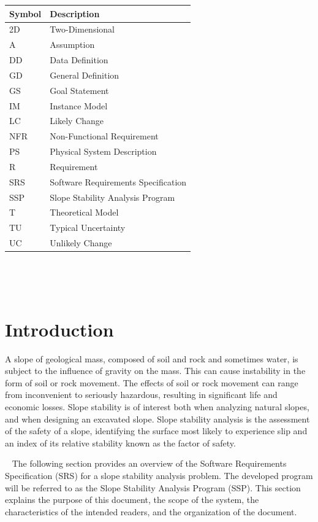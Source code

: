 \documentclass[12pt]{article}
\newcommand{\progname}{SSP}
\renewcommand{\arraystretch}{1}
\begin{document}
\renewcommand{\arraystretch}{1.2}
\begin{tabular}{l l} 
  \toprule		
  \textbf{Symbol} & \textbf{Description}\\
  \midrule 
  2D & Two-Dimensional\\
  A & Assumption\\
  DD & Data Definition\\
  GD & General Definition\\
  GS & Goal Statement\\
  IM & Instance Model\\
  LC & Likely Change\\
  NFR & Non-Functional Requirement\\
  PS & Physical System Description\\
  R & Requirement\\
  SRS & Software Requirements Specification\\
  \progname\ & Slope Stability Analysis Program\\
  T & Theoretical Model\\
  TU & Typical Uncertainty\\
  UC & Unlikely Change\\
  \bottomrule
\end{tabular}\\

\newpage

\tableofcontents

~\newpage


\section{Introduction}

A slope of geological mass, composed of soil and rock and sometimes water, is 
subject to the influence of gravity on the mass. This can cause instability in 
the form of soil or rock movement. The effects of soil or rock movement can 
range from inconvenient to seriously hazardous, resulting in significant life 
and economic losses. Slope stability is of interest both when analyzing natural 
slopes, and when designing an excavated slope. Slope stability analysis is the 
assessment of the safety of a slope, identifying the surface most likely to 
experience slip and an index of its relative stability known as the factor of 
safety.

~\newline
The following section provides an overview of the Software Requirements 
Specification (SRS) for a slope stability analysis problem. The developed 
program will be referred to as the Slope Stability Analysis Program 
(\progname). This section explains the purpose of this document, the scope of 
the system, the characteristics of the intended readers, and the organization 
of the document.
\end{document}
